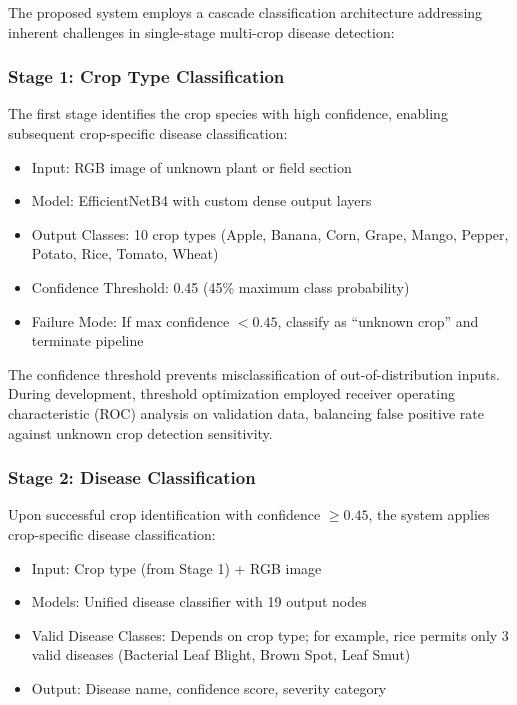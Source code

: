 \documentclass[conference]{IEEEtran}
\begin{document}
The proposed system employs a cascade classification architecture addressing inherent challenges in single-stage multi-crop disease detection:

\subsubsection{Stage 1: Crop Type Classification}

The first stage identifies the crop species with high confidence, enabling subsequent crop-specific disease classification:

\begin{itemize}
\item Input: RGB image of unknown plant or field section
\item Model: EfficientNetB4 with custom dense output layers
\item Output Classes: 10 crop types (Apple, Banana, Corn, Grape, Mango, Pepper, Potato, Rice, Tomato, Wheat)
\item Confidence Threshold: 0.45 (45\% maximum class probability)
\item Failure Mode: If max confidence $< 0.45$, classify as ``unknown crop'' and terminate pipeline
\end{itemize}

The confidence threshold prevents misclassification of out-of-distribution inputs. During development, threshold optimization employed receiver operating characteristic (ROC) analysis on validation data, balancing false positive rate against unknown crop detection sensitivity.

\subsubsection{Stage 2: Disease Classification}

Upon successful crop identification with confidence $\geq 0.45$, the system applies crop-specific disease classification:

\begin{itemize}
\item Input: Crop type (from Stage 1) + RGB image
\item Models: Unified disease classifier with 19 output nodes
\item Valid Disease Classes: Depends on crop type; for example, rice permits only 3 valid diseases (Bacterial Leaf Blight, Brown Spot, Leaf Smut)
\item Output: Disease name, confidence score, severity category
\end{itemize}
\end{document}
